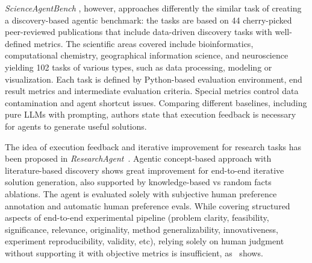 \textit{ScienceAgentBench} \citep{chenScienceAgentBenchRigorousAssessment2024}, however, approaches differently the similar task of creating a discovery-based agentic benchmark: the tasks are based on  44 cherry-picked  peer-reviewed publications that include data-driven discovery tasks with well-defined metrics.
The scientific areas covered include bioinformatics, computational chemistry, geographical information science, and neuroscience yielding 102 tasks of various types, such as data processing, modeling or visualization. Each task is defined by Python-based evaluation environment, end result metrics and intermediate evaluation criteria. Special metrics control data contamination and agent shortcut issues. Comparing different baselines, including pure LLMs with prompting, authors state that execution feedback is necessary for agents to generate useful solutions.

The idea of execution feedback and iterative improvement for research tasks has been proposed in \textit{ResearchAgent}~\citep{baekResearchAgentIterativeResearch2024}. Agentic concept-based approach with literature-based discovery shows great improvement for end-to-end iterative solution generation, also supported by knowledge-based vs random facts ablations. 
The agent is evaluated solely with subjective human preference annotation and automatic human preference evals. While covering structured aspects of end-to-end experimental pipeline (problem clarity, feasibility, significance, relevance, originality, method generalizability, innovativeness, experiment reproducibility, validity, etc), relying solely on human judgment without supporting it with objective metrics is insufficient, as~\citet{si2024llmsgeneratenovelresearch} shows.








